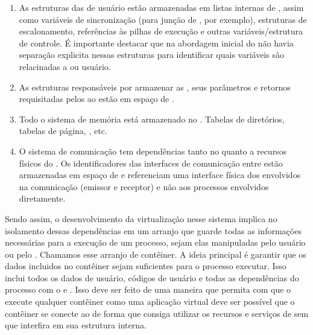 \begin{enumerate}[label=(\roman*)]
    \item As estruturas das \threads de usuário estão armazenadas em listas internas de , assim como variáveis de sincronização (para junção de \threads, por exemplo), estruturas de escalonamento, referências às pilhas de execução e outras variáveis/estrutura de controle. É importante destacar que na abordagem inicial do \nanvix não havia separação explicita nessas estruturas para identificar quais variáveis são relacinadas a  ou usuário.
    \item As estruturas responsáveis por armazenar as \syscalls, seus parâmetros e retornos requisitadas pelos \scores ao \mcore estão em espaço de .
    \item Todo o sistema de memória está armazenado no . Tabelas de diretórios, tabelas de página, \tlbs, etc.
    \item O sistema de comunicação tem dependências tanto no  quanto a recursos físicos do \cluster. Os identificadores das interfaces \noc \ie de comunicação entre \clusters estão armazenadas em espaço de  e referenciam uma interface física dos \clusters envolvidos na comunicação (emissor e receptor) e não aos processos envolvidos diretamente.
\end{enumerate}

Sendo assim, o desenvolvimento da virtualização nesse sistema implica no isolamento dessas dependências em um arranjo que guarde todas as informações necessárias para a execução de um processo, sejam elas manipuladas pelo usuário ou pelo . Chamamos esse arranjo de contêiner. A ideia principal é garantir que os dados incluidos no contêiner sejam suficientes para o processo executar. Isso inclui todos os dados de usuário, códigos de usuário e todas as dependências do processo com o  e \cluster. Isso deve ser feito de uma maneira que permita com que o  execute qualquer contêiner como uma aplicação virtual \ie deve ser possível que o contêiner se conecte ao  de forma que consiga utilizar os recursos e serviços de  sem que interfira em sua estrutura interna.

